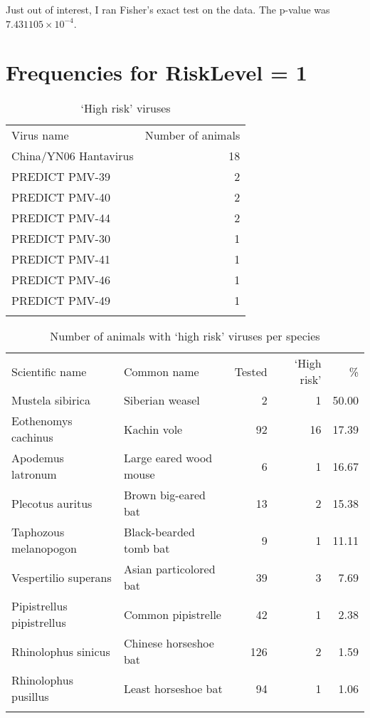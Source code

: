 \documentclass[11pt,article,oneside]{article}
\begin{document}
Just out of interest, I ran Fisher's exact test on the data. The p-value
was $7.431105\times 10^{-4}$.

\section{Frequencies for RiskLevel =
1}\label{frequencies-for-risklevel-1}

\begin{longtable}[c]{@{}lr@{}}
\toprule\addlinespace
Virus name & Number of animals
\\\addlinespace
\midrule\endhead
China/YN06 Hantavirus & 18
\\\addlinespace
PREDICT PMV-39 & 2
\\\addlinespace
PREDICT PMV-40 & 2
\\\addlinespace
PREDICT PMV-44 & 2
\\\addlinespace
PREDICT PMV-30 & 1
\\\addlinespace
PREDICT PMV-41 & 1
\\\addlinespace
PREDICT PMV-46 & 1
\\\addlinespace
PREDICT PMV-49 & 1
\\\addlinespace
\bottomrule
\addlinespace
\caption{`High risk' viruses}
\end{longtable}

\begin{longtable}[c]{@{}llrrr@{}}
\toprule\addlinespace
Scientific name & Common name & Tested & `High risk' & \%
\\\addlinespace
\midrule\endhead
Mustela sibirica & Siberian weasel & 2 & 1 & 50.00
\\\addlinespace
Eothenomys cachinus & Kachin vole & 92 & 16 & 17.39
\\\addlinespace
Apodemus latronum & Large eared wood mouse & 6 & 1 & 16.67
\\\addlinespace
Plecotus auritus & Brown big-eared bat & 13 & 2 & 15.38
\\\addlinespace
Taphozous melanopogon & Black-bearded tomb bat & 9 & 1 & 11.11
\\\addlinespace
Vespertilio superans & Asian particolored bat & 39 & 3 & 7.69
\\\addlinespace
Pipistrellus pipistrellus & Common pipistrelle & 42 & 1 & 2.38
\\\addlinespace
Rhinolophus sinicus & Chinese horseshoe bat & 126 & 2 & 1.59
\\\addlinespace
Rhinolophus pusillus & Least horseshoe bat & 94 & 1 & 1.06
\\\addlinespace
\bottomrule
\addlinespace
\caption{Number of animals with `high risk' viruses per species}
\end{longtable}
\end{document}
